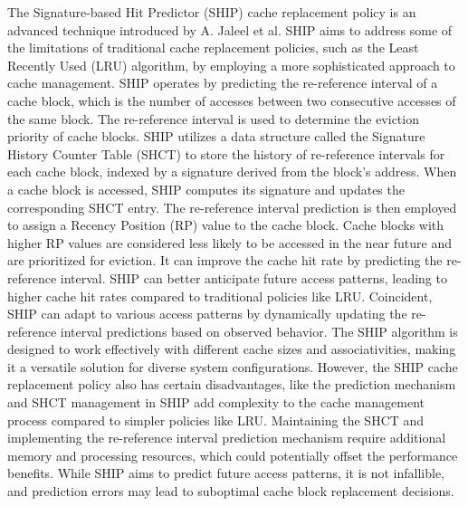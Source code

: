 The Signature-based Hit Predictor (SHIP) cache replacement policy is an advanced technique introduced by A. Jaleel et al\cite{Seznec2010}. SHIP aims to address some of the limitations of traditional cache replacement policies, such as the Least Recently Used (LRU) algorithm, by employing a more sophisticated approach to cache management. SHIP operates by predicting the re-reference interval of a cache block, which is the number of accesses between two consecutive accesses of the same block. The re-reference interval is used to determine the eviction priority of cache blocks. SHIP utilizes a data structure called the Signature History Counter Table (SHCT) to store the history of re-reference intervals for each cache block, indexed by a signature derived from the block's address. When a cache block is accessed, SHIP computes its signature and updates the corresponding SHCT entry. The re-reference interval prediction is then employed to assign a Recency Position (RP) value to the cache block. Cache blocks with higher RP values are considered less likely to be accessed in the near future and are prioritized for eviction. It can improve the cache hit rate by predicting the re-reference interval. SHIP can better anticipate future access patterns, leading to higher cache hit rates compared to traditional policies like LRU. Coincident, SHIP can adapt to various access patterns by dynamically updating the re-reference interval predictions based on observed behavior. The SHIP algorithm is designed to work effectively with different cache sizes and associativities, making it a versatile solution for diverse system configurations. However, the SHIP cache replacement policy also has certain disadvantages, like the prediction mechanism and SHCT management in SHIP add complexity to the cache management process compared to simpler policies like LRU. Maintaining the SHCT and implementing the re-reference interval prediction mechanism require additional memory and processing resources, which could potentially offset the performance benefits. While SHIP aims to predict future access patterns, it is not infallible, and prediction errors may lead to suboptimal cache block replacement decisions.\cite{Wu2011}\par



